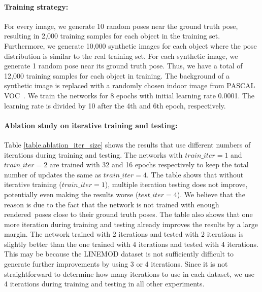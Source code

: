 \documentclass[twocolumn]{svjour3}
\newcommand{\rend}[0]{rendered}
\begin{document}
\paragraph{Training strategy:}%
%
For every image, we generate 10 random poses near the ground truth pose, resulting in 2,000 training samples for each object in the training set. Furthermore, we generate 10,000 synthetic images for each object where the pose distribution is similar to the real training set. For each synthetic image, we generate 1 random pose near its ground truth pose. Thus, we have a total of 12,000 training samples for each object in training. The background of a synthetic image is replaced with a randomly chosen indoor image from PASCAL VOC~\citep{everingham2010pascal}. We train the networks for 8 epochs with initial learning rate 0.0001. The learning rate is divided by 10 after the 4th and 6th epoch, respectively.

\paragraph{Ablation study on iterative training and testing:}%
%
Table \ref{table.ablation_iter_size} shows the results that use different numbers of iterations during training and testing. The networks with $train\_iter=1$ and $train\_iter=2$ are trained with 32 and 16 epochs respectively to keep the total number of updates the same as $train\_iter=4$. The table shows that without iterative training ($train\_iter=1$), multiple iteration testing does not improve, potentially even making the results worse ($test\_iter=4$). We believe that the reason is due to the fact that the network is not trained with enough \rend\ poses close to their ground truth poses. The table also shows that one more iteration during training and testing already improves the results by a large margin. The network trained with 2 iterations and tested with 2 iterations is slightly better than the one trained with 4 iterations and tested with 4 iterations. This may be because the LINEMOD dataset is not sufficiently difficult to generate further improvements by using 3 or 4 iterations. Since it is not straightforward to determine how many iterations to use in each dataset, we use 4 iterations during training and testing in all other experiments.
\end{document}
